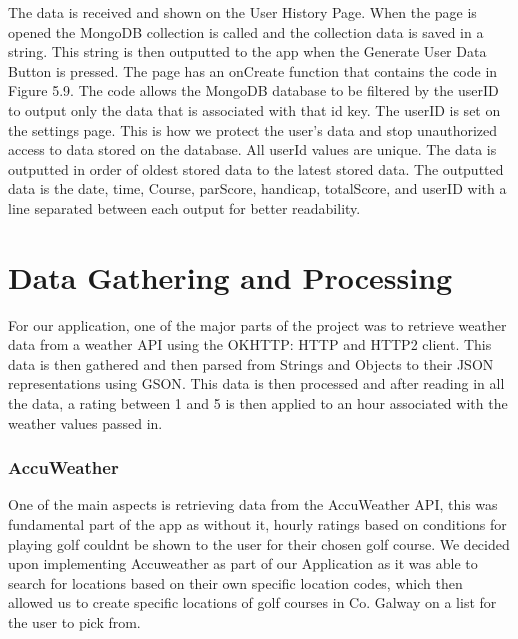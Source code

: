 The data is received and shown on the User History Page. When the page is opened the MongoDB collection is called and the collection data is saved in a string. This string is then outputted to the app when the Generate User Data Button is pressed. \newline
The page has an onCreate function that contains the code in Figure 5.9. The code allows the MongoDB database to be filtered by the userID to output only the data that is associated with that id key. The userID is set on the settings page. This is how we protect the user's data and stop unauthorized access to data stored on the database. All userId values are unique. The data is outputted in order of oldest stored data to the latest stored data. The outputted data is the date, time, Course, parScore, handicap, totalScore, and userID with a line separated between each output for better readability.

\section{Data Gathering and Processing}
For our application, one of the major parts of the project was to retrieve weather data from a weather API using the OKHTTP: HTTP and HTTP2 client\cite{ref1}. This data is then gathered and then parsed from Strings and Objects to their JSON representations using GSON\cite{ref23}. This data is then processed and after reading in all the data, a rating between 1 and 5 is then applied to an hour associated with the weather values passed in.

\subsubsection{AccuWeather}
One of the main aspects is retrieving data from the AccuWeather API\cite{ref14}, this was fundamental part of the app as without it, hourly ratings based on conditions for playing golf couldnt be shown to the user for their chosen golf course. We decided upon implementing Accuweather as part of our Application as it was able to search for locations based on their own specific location codes, which then allowed us to create specific locations of golf courses in Co. Galway on a list for the user to pick from.

